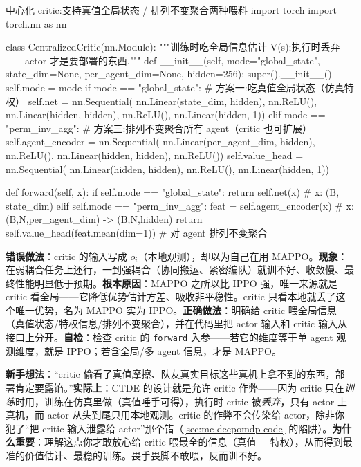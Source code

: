 \begin{codebox}[Python]{中心化 critic:支持真值全局状态 / 排列不变聚合两种喂料}
import torch
import torch.nn as nn

class CentralizedCritic(nn.Module):
    """训练时吃全局信息估计 V(s);执行时丢弃——actor 才是要部署的东西."""
    def __init__(self, mode="global_state", state_dim=None, per_agent_dim=None, hidden=256):
        super().__init__()
        self.mode = mode
        if mode == "global_state":                 # 方案一:吃真值全局状态（仿真特权）
            self.net = nn.Sequential(
                nn.Linear(state_dim, hidden), nn.ReLU(),
                nn.Linear(hidden, hidden), nn.ReLU(),
                nn.Linear(hidden, 1))
        elif mode == "perm_inv_agg":               # 方案三:排列不变聚合所有 agent（critic 也可扩展）
            self.agent_encoder = nn.Sequential(
                nn.Linear(per_agent_dim, hidden), nn.ReLU(),
                nn.Linear(hidden, hidden), nn.ReLU())
            self.value_head = nn.Sequential(
                nn.Linear(hidden, hidden), nn.ReLU(),
                nn.Linear(hidden, 1))

    def forward(self, x):
        if self.mode == "global_state":
            return self.net(x)                     # x: (B, state_dim)
        elif self.mode == "perm_inv_agg":
            feat = self.agent_encoder(x)           # x:(B,N,per_agent_dim) -> (B,N,hidden)
            return self.value_head(feat.mean(dim=1))   # 对 agent 排列不变聚合
\end{codebox}

\begin{pitfall}
\textbf{错误做法}：critic 的输入写成 $o_i$（本地观测），却以为自己在用 MAPPO。\textbf{现象}：在弱耦合任务上还行，一到强耦合（协同搬运、紧密编队）就训不好、收敛慢、最终性能明显低于预期。\textbf{根本原因}：MAPPO 之所以比 IPPO 强，唯一来源就是 critic 看全局——它降低优势估计方差、吸收非平稳性。critic 只看本地就丢了这个唯一优势，名为 MAPPO 实为 IPPO。\textbf{正确做法}：明确给 critic 喂全局信息（真值状态/特权信息/排列不变聚合），并在代码里把 actor 输入和 critic 输入从接口上分开。\textbf{自检}：检查 critic 的 \verb|forward| 入参——若它的维度等于单 agent 观测维度，就是 IPPO；若含全局/多 agent 信息，才是 MAPPO。
\end{pitfall}

\begin{pitfall}
\textbf{新手想法}：“critic 偷看了真值摩擦、队友真实目标这些真机上拿不到的东西，部署肯定要露馅。”\textbf{实际上}：CTDE 的设计就是允许 critic 作弊——因为 critic 只在\emph{训练}时用，训练在仿真里做（真值唾手可得），执行时 critic 被\emph{丢弃}，只有 actor 上真机，而 actor 从头到尾只用本地观测。critic 的作弊不会传染给 actor，除非你犯了“把 critic 输入泄露给 actor”那个错（\cref{sec:mc-decpomdp-code} 的陷阱）。\textbf{为什么重要}：理解这点你才敢放心给 critic 喂最全的信息（真值 $+$ 特权），从而得到最准的价值估计、最稳的训练。畏手畏脚不敢喂，反而训不好。
\end{pitfall}

